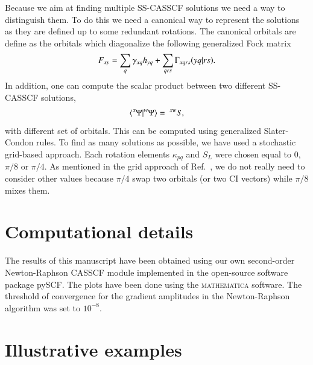 \documentclass[aps,prb,reprint,showkeys,superscriptaddress]{revtex4-1}
\begin{document}
Because we aim at finding multiple SS-CASSCF solutions we need a way to distinguish them.
To do this we need a canonical way to represent the solutions as they are defined up to some redundant rotations. \cite{Helgaker_2000}
The canonical orbitals are define as the orbitals which diagonalize the following generalized Fock matrix
\begin{equation}
  \label{eq:general_fock}
  F_{xy} = \sum_q \gamma_{xq}h_{yq} + \sum_{qrs} \Gamma_{xqrs}\ceri{yq}{rs}.
\end{equation}
In addition, one can compute the scalar product between two different SS-CASSCF solutions,
\begin{equation}
  \label{eq:scalprod}
  \braket{^x\Psi}{^w\Psi} =~^{xw}S,
\end{equation}
with different set of orbitals. This can be computed using generalized Slater-Condon rules. \cite{Burton_2021a}
To find as many solutions as possible, we have used a stochastic grid-based approach.
Each rotation elements $\kappa_{pq}$ and $S_{L}$ were chosen equal to $0$, $\pi/8$ or $\pi/4$.
As mentioned in the grid approach of Ref.~, we do not really need to consider other values because $\pi/4$ swap two orbitals (or two CI vectors) while $\pi/8$ mixes them.

\section{Computational details}
\label{sec:comp_details}

The results of this manuscript have been obtained using our own second-order Newton-Raphson CASSCF module implemented in the open-source software package pySCF. \cite{Sun_2020}
The plots have been done using the \textsc{mathematica} software. \cite{Mathematica}
The threshold of convergence for the gradient amplitudes in the Newton-Raphson algorithm was set to $10^{-8}$.

\section{Illustrative examples}
\label{sec:illustrative}
\end{document}
